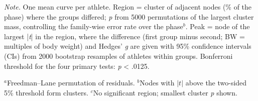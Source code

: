 \begin{table}[!htbp]
\begin{threeparttable}
\begin{tablenotes}[flushleft]
\item \textit{Note.} One mean curve per athlete. Region = cluster of adjacent nodes (\% of the phase) where the groups differed; \textit{p} from 5000 permutations of the largest cluster mass, controlling the family-wise error rate over the phase$^{b}$. Peak = node of the largest |\textit{t}| in the region, where the difference (first group minus second; BW = multiples of body weight) and Hedges' \textit{g} are given with 95\% confidence intervals (CIs) from 2000 bootstrap resamples of athletes within groups. Bonferroni threshold for the four primary tests: \textit{p} < .0125.
\item $^{a}$Freedman--Lane permutation of residuals. $^{b}$Nodes with $|t|$ above the two-sided 5\% threshold form clusters. $^{c}$No significant region; smallest cluster \textit{p} shown.
\end{tablenotes}
\end{threeparttable}
\end{table}
